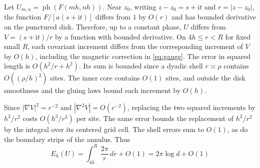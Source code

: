 \documentclass[11pt,reqno]{amsart}
\newcommand{\ph}{\operatorname{ph}}
\newcommand{\ii}{\mathrm i}
\begin{document}
Let $U_{m,n}=\ph(F(mh,nh))$. Near $z_0$, writing $z-z_0=s+\ii t$ and $r=|z-z_0|$, the function $F/[a(s+\ii t)]$ differs from $1$ by $O(r)$ and has bounded derivative on the punctured disk. Therefore, up to a constant phase, $U$ differs from $V=(s+\ii t)/r$ by a function with bounded derivative. On $4h\le r<R$ for fixed small $R$, each covariant increment differs from the corresponding increment of $V$ by $O(h)$, including the magnetic correction in \eqref{eq:gauge}. The error in squared length is $O(h^2/r+h^2)$. Its sum is bounded since a dyadic shell $r\asymp\rho$ contains $O((\rho/h)^2)$ sites. The inner core contains $O(1)$ sites, and outside the disk smoothness and the gluing laws bound each increment by $O(h)$.

Since $|\nabla V|^2=r^{-2}$ and $|\nabla^2 V|=O(r^{-2})$, replacing the two squared increments by $h^2/r^2$ costs $O(h^3/r^3)$ per site. The same error bounds the replacement of $h^2/r^2$ by the integral over its centered grid cell. The shell errors sum to $O(1)$, as do the boundary strips of the annulus. Thus
\begin{equation}\label{eq:vortex}
 E_h(U)=\int_{4h}^R\frac{2\pi}{r}\,dr+O(1)=2\pi\log d+O(1)
\end{equation}
\end{document}
